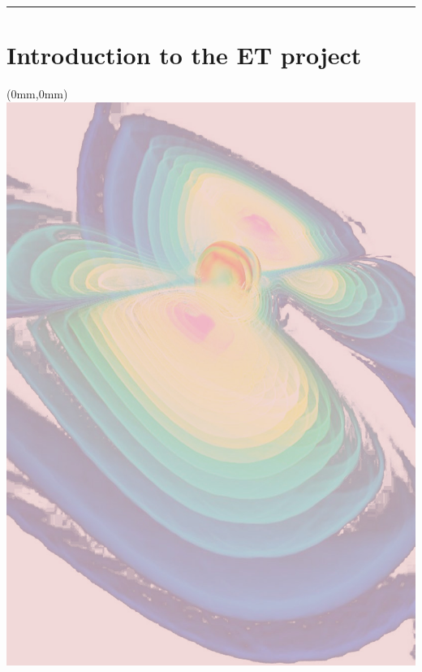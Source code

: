 \documentclass[draft,color,DIV12,pdftex,a4paper]{ET-DS}
\begin{document}
\setcounter{page}{4}
%
{\setlength{\baselineskip}{0pt} \tableofcontents}
\vspace{1cm}
\hrule height 1pt


\citeindextrue
\cleardoublepage  
\cleardoublepage  
\FloatBarrier
\section{Introduction to the ET project}

%
\cleardoublepage
\FloatBarrier
\begin{textblock*}{297mm}(0mm,0mm)   \includegraphics[width=\paperwidth]{Sec_ET_ScienceCase/BackgroundFirstPageScienceCase.jpg}
\end{textblock*}
\end{document}
